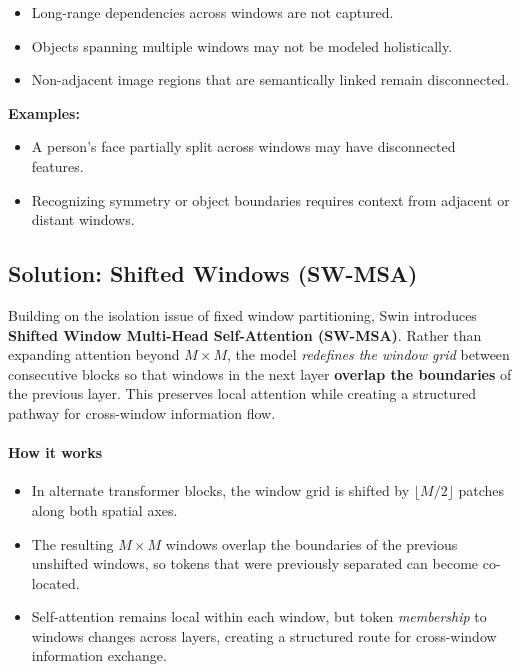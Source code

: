 \begin{itemize}
    \item Long-range dependencies across windows are not captured.
    \item Objects spanning multiple windows may not be modeled holistically.
    \item Non-adjacent image regions that are semantically linked remain disconnected.
\end{itemize}

\noindent
\textbf{Examples:}
\begin{itemize}
    \item A person’s face partially split across windows may have disconnected features.
    \item Recognizing symmetry or object boundaries requires context from adjacent or distant windows.
\end{itemize}

\subsection{Solution: Shifted Windows (SW-MSA)}
\label{subsec:chapter18_swin_shifted}

\noindent
Building on the isolation issue of fixed window partitioning,
Swin introduces \textbf{Shifted Window Multi-Head Self-Attention (SW-MSA)}.
Rather than expanding attention beyond \(M \times M\),
the model \emph{redefines the window grid} between consecutive blocks
so that windows in the next layer \textbf{overlap the boundaries} of the previous layer.
This preserves local attention while creating a structured pathway
for cross-window information flow.

\paragraph{How it works}
\begin{itemize}
	\item In alternate transformer blocks, the window grid is shifted by
	\(\lfloor M/2 \rfloor\) patches along both spatial axes.
	\item The resulting \(M \times M\) windows overlap the boundaries of the previous
	unshifted windows, so tokens that were previously separated can become co-located.
	\item Self-attention remains local within each window,
	but token \emph{membership} to windows changes across layers,
	creating a structured route for cross-window information exchange.
\end{itemize}

